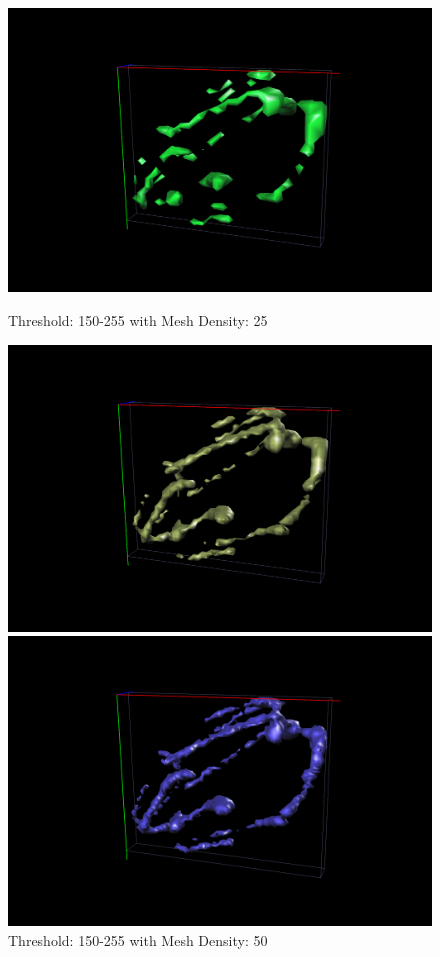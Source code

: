 \documentclass{article}
\begin{document}
\begin{figure}[ht]
  \centering
  \begin{minipage}[b]{0.5\linewidth}
    \centering
    \includegraphics[width=.8\linewidth]{Report/Images/6.3.2/150-255,25.png}
    \captionsetup{width=.8\linewidth}
    \caption{Threshold: 150-255 with Mesh Density: 25}
    \label{fig:150255_25}
    \vspace{4ex}
  \end{minipage}%
  \begin{minipage}[b]{0.5\linewidth}
    \centering
    \includegraphics[width=.8\linewidth]{Report/Images/6.3.2/150-255,50.png}
    \captionsetup{width=.8\linewidth}
    \caption{Threshold: 150-255 with Mesh Density: 50}
    \label{fig:150255_50}
    \vspace{4ex}
  \end{minipage} 
  \begin{minipage}[b]{0.5\linewidth}
    \centering
    \includegraphics[width=.8\linewidth]{Report/Images/6.3.2/150-255_75.png}

\end{minipage}
\end{figure}
\end{document}
